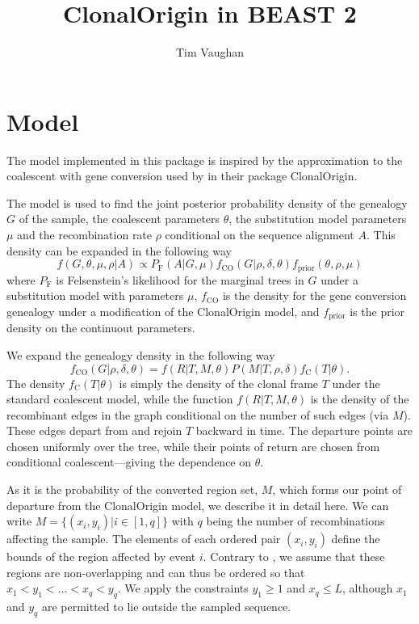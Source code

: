 \documentclass[a4paper,10pt]{article}
\title{ClonalOrigin in BEAST 2}
\author{Tim Vaughan}
\begin{document}
\maketitle{}

\section{Model}

The model implemented in this package is inspired by the approximation
to the coalescent with gene conversion \citep{Wiuf2000a} used by
\cite{Didelot2010} in their package ClonalOrigin. 

The model is used to find the joint posterior probability density of the
genealogy $G$ of the sample, the coalescent parameters $\theta$, the
substitution model parameters $\mu$ and the recombination rate $\rho$
conditional on the sequence alignment $A$.  This density can be
expanded in the following way
\begin{equation}
f(G,\theta,\mu,\rho|A) \propto P_{\mathrm{F}}(A|G,\mu)f_{\mathrm{CO}}(G|\rho,\delta,\theta)f_{\mathrm{prior}}(\theta,\rho,\mu)
\end{equation}
where $P_{\mathrm{F}}$ is Felsenstein's likelihood for the marginal
trees in $G$ under a substitution model with parameters $\mu$,
$f_{\mathrm{CO}}$ is the density for the gene conversion genealogy
under a modification of the ClonalOrigin model, and
$f_{\mathrm{prior}}$ is the prior density on the continuout
parameters.

We expand the genealogy density in the following way
\begin{equation}
f_{\mathrm{CO}}(G|\rho,\delta,\theta)=f(R|T,M,\theta)P(M|T,\rho,\delta)f_{\mathrm{C}}(T|\theta).
\end{equation}
The density $f_{\mathrm{C}}(T|\theta)$ is simply the density of the
clonal frame $T$ under the standard coalescent model, while the function
$f(R|T,M,\theta)$ is the density of the recombinant edges in the
graph conditional on the number of such edges (via $M$).  These edges
depart from and rejoin $T$ backward in time.  The departure points are
chosen uniformly over the tree, while their points of return are
chosen from conditional coalescent---giving the dependence on
$\theta$.

As it is the probability of the converted region set, $M$, which forms
our point of departure from the ClonalOrigin model, we describe it in
detail here.  We can write $M=\{(x_i,y_i)|i\in[1,q]\}$ with $q$ being
the number of recombinations affecting the sample. The elements of
each ordered pair $(x_i,y_i)$ define the bounds of the region affected
by event $i$. Contrary to \cite{Didelot2010}, we assume that these
regions are non-overlapping and can thus be ordered so that
$x_1<y_1<\ldots<x_q<y_q$. We apply the constraints $y_1\geq1$ and
$x_q\leq L$, although $x_1$ and $y_q$ are permitted to lie outside the
sampled sequence.
\end{document}
